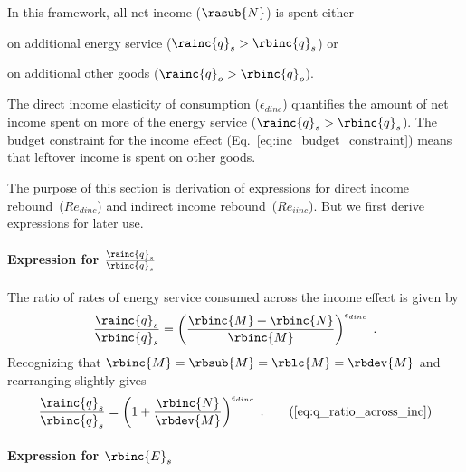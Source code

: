 In this framework, all net income ($\rasub{N}$) is spent either 
%
\begin{enumerate*}[label={(\alph*)}]
	
  \item on additional energy service ($\rainc{q}_s > \rbinc{q}_s$) or
  
  \item on additional other goods ($\rainc{q}_o > \rbinc{q}_o$).
    
\end{enumerate*}
%
The direct income elasticity of consumption ($\epsilon_{dinc}$) 
quantifies the amount of net income spent 
on more of the energy service ($\rainc{q}_s > \rbinc{q}_s$).
The budget constraint for the income effect (Eq.~\ref{eq:inc_budget_constraint}) 
means that leftover income is spent on other goods.

The purpose of this section is derivation of expressions for 
direct income rebound~($Re_{dinc}$) and indirect income rebound~($Re_{iinc}$).
But we first derive expressions for later use.


\paragraph{Expression for $\frac{\rainc{q}_s}{\rbinc{q}_s}$}
\label{sec:qs_ratio}

The ratio of rates of energy service consumed across the income effect is given by
%
\begin{equation}
  \frac{\rainc{q}_s}{\rbinc{q}_s} = \left( \frac{\rbinc{M} + \rbinc{N}}{\rbinc{M}} \right) ^ {\epsilon_{dinc}} \; .
\end{equation}
%
Recognizing that $\rbinc{M} = \rbsub{M} = \rblc{M} = \rbdev{M}$ and rearranging slightly gives
%
\begin{equation}
  \frac{\rainc{q}_s}{\rbinc{q}_s} = \left( 1 + \frac{\rbinc{N}}{\rbdev{M}} \right) ^ {\epsilon_{dinc}} \; . 
                                                                                \tag{\ref{eq:q_ratio_across_inc}}
\end{equation}


\paragraph{Expression for $\rbinc{E}_s$} 
\label{sec:E_dot_s_hat_expression}

